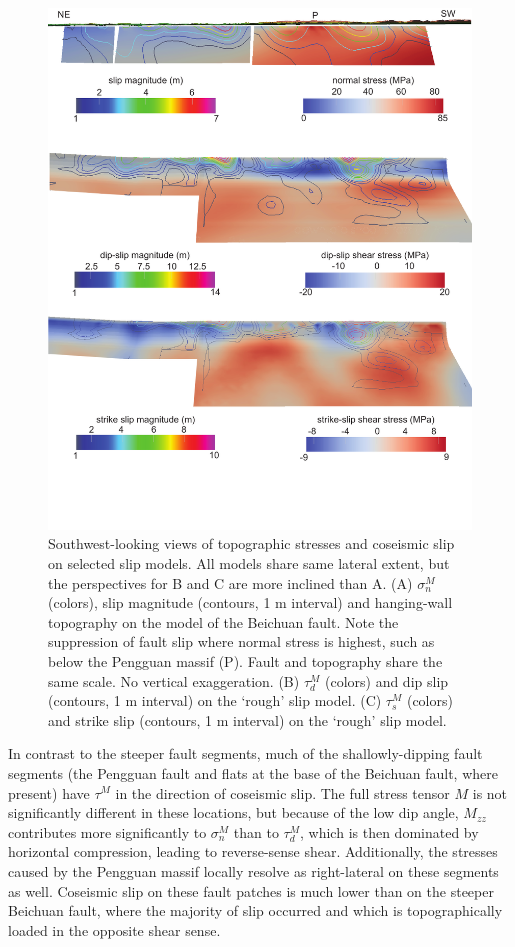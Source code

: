 \documentclass[twocolumn,jgrga]{AGUTeX}
\begin{document}
\begin{article}
\begin{figure}[htbp]
\centering
\includegraphics[width=40pc]{../figures/fault_stress_3d.pdf}
\caption{Southwest-looking views of topographic stresses and coseismic
slip on selected slip models. All models share same lateral extent, but
the perspectives for B and C are more inclined than A. (A) $\sigma_n^M$
(colors), slip magnitude (contours, 1 m interval) and hanging-wall
topography on the \citet{feng2010} model of the Beichuan
fault. Note the suppression of fault slip where normal stress is
highest, such as below the Pengguan massif (P). Fault and topography
share the same scale. No vertical exaggeration. (B) $\tau_d^M$ (colors)
and dip slip (contours, 1 m interval) on the \citet{qi2011}
`rough' slip model. (C) $\tau_s^M$ (colors) and strike slip (contours, 1
m interval) on the \citet{qi2011} `rough' slip model.}
\label{fig:fault_stress_3d}
\end{figure}

In contrast to the steeper fault segments, much of the shallowly-dipping
fault segments (the Pengguan fault and flats at the base of the Beichuan
fault, where present) have $\tau^M$ in the direction of coseismic slip.
The full stress tensor $M$ is not significantly different in these
locations, but because of the low dip angle, $M_{zz}$ contributes more
significantly to $\sigma^M_n$ than to $\tau^M_d$, which is then
dominated by horizontal compression, leading to reverse-sense shear.
Additionally, the stresses caused by the Pengguan massif locally resolve
as right-lateral on these segments as well. Coseismic slip on these
fault patches is much lower than on the steeper Beichuan fault, where
the majority of slip occurred and which is topographically loaded in the
opposite shear sense.


\end{article}
\end{document}
